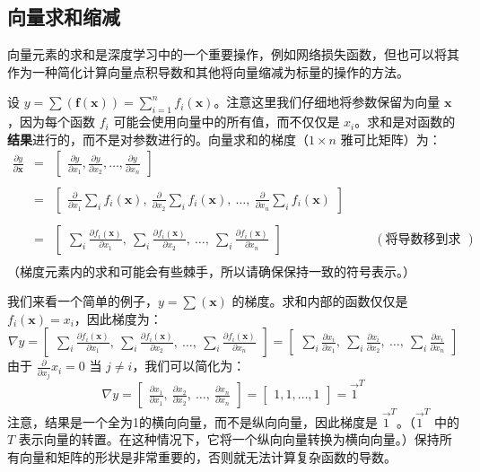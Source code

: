\documentclass[11pt]{article}
\begin{document}
\subsection{向量求和缩减}\label{sec4.4}

向量元素的求和是深度学习中的一个重要操作，例如网络损失函数，但也可以将其作为一种简化计算向量点积导数和其他将向量缩减为标量的操作的方法。

设 $y = \sum( \mathbf{f}(\mathbf{x})) = \sum_{i=1}^n f_i(\mathbf{x})$。注意这里我们仔细地将参数保留为向量 $\mathbf{x}$，因为每个函数 $f_i$ 可能会使用向量中的所有值，而不仅仅是 $x_i$。求和是对函数的{\bf 结果}进行的，而不是对参数进行的。向量求和的梯度（$1 \times n$ 雅可比矩阵）为：
\[
\begin{array}{lcllll}
 \frac{\partial y}{\partial \mathbf{x}} & = & \begin{bmatrix} \frac{\partial y}{\partial x_1}, \frac{\partial y}{\partial x_2}, \ldots, \frac{\partial y}{\partial x_n} \end{bmatrix}\\\\
  & = & \begin{bmatrix} \frac{\partial}{\partial x_1} \sum_i f_i(\mathbf{x}),~ \frac{\partial}{\partial x_2} \sum_i f_i(\mathbf{x}),~ \ldots,~ \frac{\partial}{\partial x_n} \sum_i  f_i(\mathbf{x}) \end{bmatrix} \\\\
 & = & \begin{bmatrix} \sum_i \frac{\partial f_i(\mathbf{x})}{\partial x_1},~ \sum_i \frac{\partial f_i(\mathbf{x})}{\partial x_2},~ \ldots,~ \sum_i \frac{\partial f_i(\mathbf{x})}{\partial x_n}  \end{bmatrix}&&&(\text{将导数移到求和号内})\\
\end{array}
\]
（梯度元素内的求和可能会有些棘手，所以请确保保持一致的符号表示。）

我们来看一个简单的例子，$y = \sum(\mathbf{x})$ 的梯度。求和内部的函数仅仅是 $f_i(\mathbf{x}) = x_i$，因此梯度为：
\[\nabla y = \begin{bmatrix} \sum_i \frac{\partial f_i(\mathbf{x})}{\partial x_1},~ \sum_i \frac{\partial f_i(\mathbf{x})}{\partial x_2},~ \ldots,~ \sum_i \frac{\partial f_i(\mathbf{x})}{\partial x_n}  \end{bmatrix} = \begin{bmatrix} \sum_i \frac{\partial x_i}{\partial x_1},~ \sum_i \frac{\partial x_i}{\partial x_2},~ \ldots,~ \sum_i \frac{\partial x_i}{\partial x_n}  \end{bmatrix}\]
由于 $\frac{\partial}{\partial x_j} x_i = 0$ 当 $j \neq i$，我们可以简化为：
\[\nabla y = \begin{bmatrix} \frac{\partial x_1}{\partial x_1},~ \frac{\partial x_2}{\partial x_2},~ \ldots,~ \frac{\partial x_n}{\partial x_n}  \end{bmatrix} = \begin{bmatrix}1, 1, \ldots, 1\end{bmatrix} = \vec{1}^T\]
注意，结果是一个全为1的横向向量，而不是纵向向量，因此梯度是 $\vec{1}^T$。（$\vec{1}^T$ 中的 $T$ 表示向量的转置。在这种情况下，它将一个纵向向量转换为横向向量。）保持所有向量和矩阵的形状是非常重要的，否则就无法计算复杂函数的导数。
\end{document}
